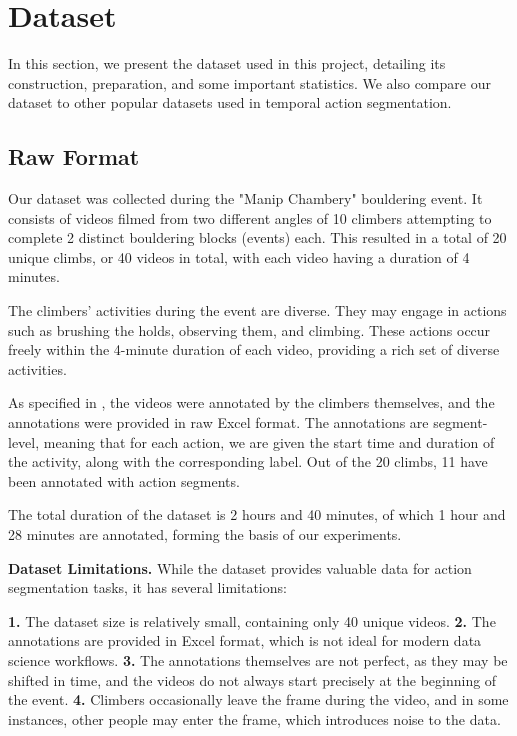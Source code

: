 \section{Dataset}

In this section, we present the dataset used in this project, detailing its construction, preparation, and some important statistics. We also compare our dataset to other popular datasets used in temporal action segmentation.

\subsection{Raw Format}

Our dataset was collected during the "Manip Chambery" bouldering event. It consists of videos filmed from two different angles of 10 climbers attempting to complete 2 distinct bouldering blocks (events) each. This resulted in a total of 20 unique climbs, or 40 videos in total, with each video having a duration of 4 minutes.

The climbers' activities during the event are diverse. They may engage in actions such as brushing the holds, observing them, and climbing. These actions occur freely within the 4-minute duration of each video, providing a rich set of diverse activities.

As specified in \cite{section:context}, the videos were annotated by the climbers themselves, and the annotations were provided in raw Excel format. The annotations are segment-level, meaning that for each action, we are given the start time and duration of the activity, along with the corresponding label. Out of the 20 climbs, 11 have been annotated with action segments.

The total duration of the dataset is 2 hours and 40 minutes, of which 1 hour and 28 minutes are annotated, forming the basis of our experiments.

\noindent\textbf{Dataset Limitations.}  
While the dataset provides valuable data for action segmentation tasks, it has several limitations: 

\textbf{1.} The dataset size is relatively small, containing only 40 unique videos.
\textbf{2.} The annotations are provided in Excel format, which is not ideal for modern data science workflows.
\textbf{3.} The annotations themselves are not perfect, as they may be shifted in time, and the videos do not always start precisely at the beginning of the event.
\textbf{4.} Climbers occasionally leave the frame during the video, and in some instances, other people may enter the frame, which introduces noise to the data.

